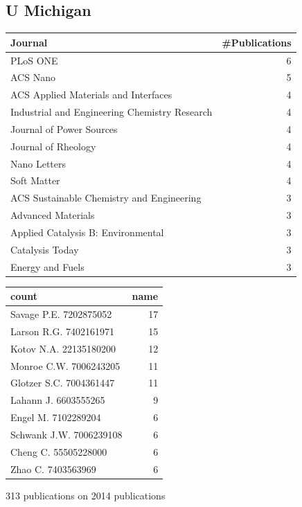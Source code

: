\documentclass[11pt]{article}
\begin{document}
\subsection{U Michigan}
\label{sec-1-12}
\begin{center}
\begin{tabular}{lr}
Journal & \#Publications\\
\hline
PLoS ONE & 6\\
ACS Nano & 5\\
ACS Applied Materials and Interfaces & 4\\
Industrial and Engineering Chemistry Research & 4\\
Journal of Power Sources & 4\\
Journal of Rheology & 4\\
Nano Letters & 4\\
Soft Matter & 4\\
ACS Sustainable Chemistry and Engineering & 3\\
Advanced Materials & 3\\
Applied Catalysis B: Environmental & 3\\
Catalysis Today & 3\\
Energy and Fuels & 3\\
\end{tabular}
\end{center}

\begin{center}
\begin{tabular}{lr}
count & name\\
\hline
Savage P.E. 7202875052 & 17\\
Larson R.G. 7402161971 & 15\\
Kotov N.A. 22135180200 & 12\\
Monroe C.W. 7006243205 & 11\\
Glotzer S.C. 7004361447 & 11\\
Lahann J. 6603555265 & 9\\
Engel M. 7102289204 & 6\\
Schwank J.W. 7006239108 & 6\\
Cheng C. 55505228000 & 6\\
Zhao C. 7403563969 & 6\\
\end{tabular}
\end{center}

313 publications on 2014 publications
\end{document}
